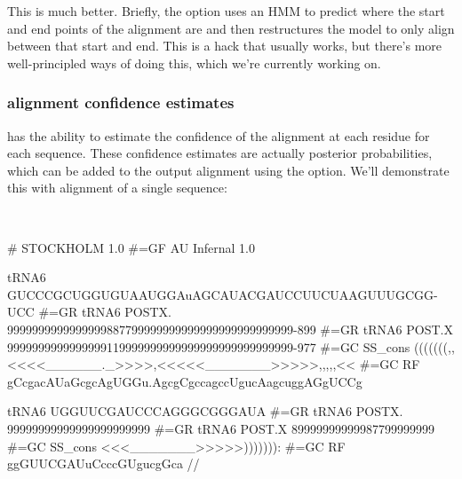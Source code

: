This is much better. Briefly, the  option uses an HMM to
predict where the start and end points of the alignment are and then
restructures the model to only align between that start and end. This
is a hack that usually works, but there's more well-principled ways of
doing this, which we're currently working on.

\subsubsection{alignment confidence estimates}
 has the ability to estimate the confidence of the
alignment at each residue for each sequence. These confidence estimates
are actually posterior probabilities, which can be added to
the output alignment using the  option. We'll demonstrate
this with alignment of a single sequence:

\\

{\samepage
\begin{sreoutput}
# STOCKHOLM 1.0
#=GF AU Infernal 1.0

tRNA6             GUCCCGCUGGUGUAAUGGAuAGCAUACGAUCCUUCUAAGUUUGCGG-UCC
#=GR tRNA6 POSTX. 9999999999999999887799999999999999999999999999-899
#=GR tRNA6 POST.X 9999999999999999119999999999999999999999999999-977
#=GC SS_cons      (((((((,,<<<<______._>>>>,<<<<<_______>>>>>,,,,,<<
#=GC RF           gCcgacAUaGcgcAgUGGu.AgcgCgccagccUgucAagcuggAGgUCCg

tRNA6             UGGUUCGAUCCCAGGGCGGGAUA
#=GR tRNA6 POSTX. 99999999999999999999999
#=GR tRNA6 POST.X 89999999999987799999999
#=GC SS_cons      <<<_______>>>>>))))))):
#=GC RF           ggGUUCGAUuCcccGUgucgGca
//
\end{sreoutput}
}

